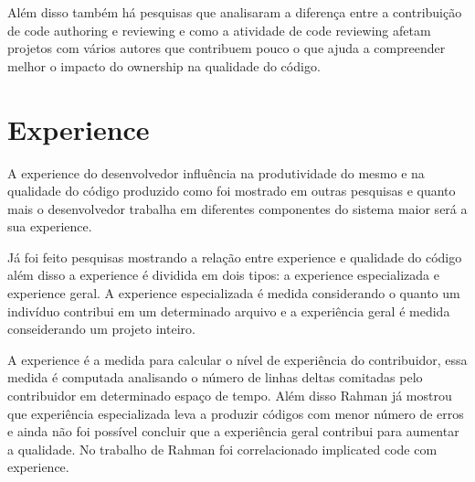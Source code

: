 Além disso também há pesquisas\cite{Thongtanunam} que analisaram a diferença entre a contribuição de code authoring e reviewing e como a atividade de code reviewing afetam projetos com vários autores que contribuem pouco o que ajuda a compreender melhor o impacto do ownership na qualidade do código.

\section{Experience}
A experience do desenvolvedor influência na produtividade do mesmo e na qualidade do código produzido como foi mostrado em outras pesquisas\cite{Rahman2011}\cite{10.2307/2634607} e quanto mais o desenvolvedor trabalha em diferentes componentes do sistema maior será a sua experience.

Já foi feito pesquisas\cite{Rahman2011} mostrando a relação entre experience e qualidade do código além disso a experience é dividida em dois tipos: a experience especializada e experience geral. A experience especializada é medida considerando o quanto um indivíduo contribui em um determinado arquivo e a experiência geral é medida conseiderando um projeto inteiro.

A experience é a medida para calcular o nível de experiência do contribuidor, essa medida é computada analisando o número de linhas\cite{Rahman2011} deltas comitadas pelo contribuidor em determinado espaço de tempo. Além disso Rahman já mostrou que experiência especializada leva a produzir códigos com menor número de erros e ainda não foi possível concluir que a experiência geral contribui para aumentar a qualidade. No trabalho de Rahman foi correlacionado implicated code com experience.

